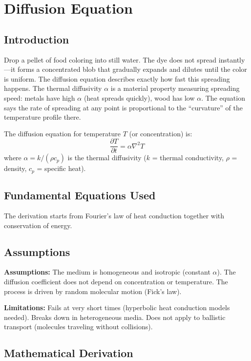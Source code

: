 \chapter{Diffusion Equation}

\section*{Introduction}

Drop a pellet of food coloring into still water. The dye does not spread instantly---it forms a concentrated blob that gradually expands and dilutes until the color is uniform. The diffusion equation describes exactly how fast this spreading happens. The thermal diffusivity $\alpha$ is a material property measuring spreading speed: metals have high $\alpha$ (heat spreads quickly), wood has low $\alpha$. The equation says the rate of spreading at any point is proportional to the ``curvature'' of the temperature profile there.


The diffusion equation for temperature $T$ (or concentration) is:
\[
\frac{\partial T}{\partial t} = \alpha \nabla^2 T
\]
where $\alpha = k/(\rho c_p)$ is the thermal diffusivity ($k$ = thermal conductivity, $\rho$ = density, $c_p$ = specific heat).

\section*{Fundamental Equations Used}

The derivation starts from Fourier's law of heat conduction together with conservation of energy.

\section*{Assumptions}

\textbf{Assumptions:} The medium is homogeneous and isotropic (constant $\alpha$). The diffusion coefficient does not depend on concentration or temperature. The process is driven by random molecular motion (Fick's law).


\textbf{Limitations:} Fails at very short times (hyperbolic heat conduction models needed). Breaks down in heterogeneous media. Does not apply to ballistic transport (molecules traveling without collisions).


\section*{Mathematical Derivation}

